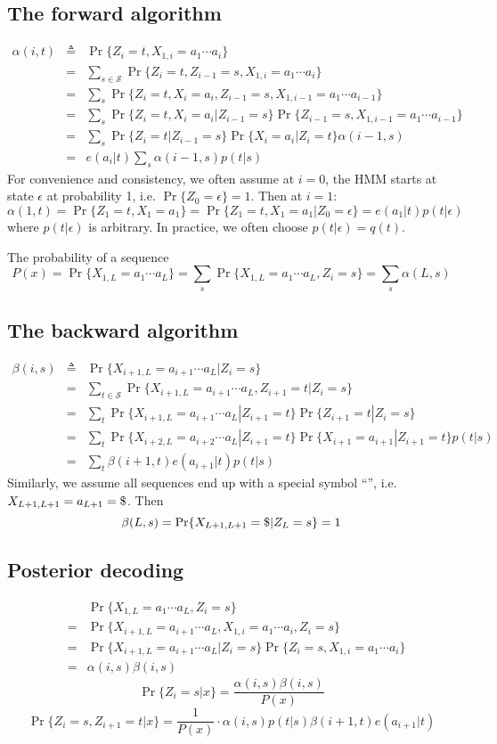 \documentclass[10pt]{article}
\begin{document}
\subsection{The forward algorithm}
\begin{eqnarray*}
\alpha(i,t)&\triangleq&\Pr\{Z_i=t,X_{1,i}=a_1\cdots a_i\}\\
&=&\sum_{s\in\mathcal{S}}\Pr\{Z_i=t,Z_{i-1}=s,X_{1,i}=a_1\cdots a_i\}\\
&=&\sum_s\Pr\{Z_i=t,X_i=a_i,Z_{i-1}=s,X_{1,{i-1}}=a_1\cdots a_{i-1}\}\\
&=&\sum_s\Pr\{Z_i=t,X_i=a_i|Z_{i-1}=s\}\Pr\{Z_{i-1}=s,X_{1,{i-1}}=a_1\cdots a_{i-1}\}\\
&=&\sum_s\Pr\{Z_i=t|Z_{i-1}=s\}\Pr\{X_i=a_i|Z_i=t\}\alpha(i-1,s)\\
&=&e(a_i|t)\sum_s\alpha(i-1,s)p(t|s)
\end{eqnarray*}
For convenience and consistency, we often assume at $i=0$, the HMM starts at
state $\epsilon$ at probability 1, i.e. $\Pr\{Z_0=\epsilon\}=1$. Then at $i=1$:
$$
\alpha(1,t)=\Pr\{Z_1=t,X_1=a_1\}=\Pr\{Z_1=t,X_1=a_1|Z_0=\epsilon\}=e(a_1|t)p(t|\epsilon)
$$
where $p(t|\epsilon)$ is arbitrary. In practice, we often choose
$p(t|\epsilon)=q(t)$.

The probability of a sequence
$$
P(x)=\Pr\{X_{1,L}=a_1\cdots a_L\}=\sum_s\Pr\{X_{1,L}=a_1\cdots a_L,Z_i=s\}=\sum_s\alpha(L,s)
$$

\subsection{The backward algorithm}
\begin{eqnarray*}
\beta(i,s)&\triangleq&\Pr\{X_{i+1,L}=a_{i+1}\cdots a_L|Z_i=s\}\\
&=&\sum_{t\in\mathcal{S}}\Pr\{X_{i+1,L}=a_{i+1}\cdots a_L,Z_{i+1}=t|Z_i=s\}\\
&=&\sum_t\Pr\{X_{i+1,L}=a_{i+1}\cdots a_L|Z_{i+1}=t\}\Pr\{Z_{i+1}=t|Z_i=s\}\\
&=&\sum_t\Pr\{X_{i+2,L}=a_{i+2}\cdots a_L|Z_{i+1}=t\}\Pr\{X_{i+1}=a_{i+1}|Z_{i+1}=t\}p(t|s)\\
&=&\sum_t\beta(i+1,t)e(a_{i+1}|t)p(t|s)
\end{eqnarray*}
Similarly, we assume all sequences end up with a special symbol
``{\tt{}}'', i.e. $X_{L+1,L+1}=a_{L+1}={\tt\char36}$. Then
$$
\beta(L,s)=\Pr\{X_{L+1,L+1}={\tt\char36}|Z_L=s\}=1
$$

\subsection{Posterior decoding}
\begin{eqnarray*}
&& \Pr\{X_{1,L}=a_1\cdots a_L,Z_i=s\}\\
&=&\Pr\{X_{i+1,L}=a_{i+1}\cdots a_L,X_{1,i}=a_1\cdots a_i,Z_i=s\}\\
&=&\Pr\{X_{i+1,L}=a_{i+1}\cdots a_L|Z_i=s\}\Pr\{Z_i=s,X_{1,i}=a_1\cdots a_i\}\\
&=&\alpha(i,s)\beta(i,s)
\end{eqnarray*}
$$
\Pr\{Z_i=s|x\}=\frac{\alpha(i,s)\beta(i,s)}{P(x)}
$$
$$
\Pr\{Z_i=s,Z_{i+1}=t|x\}=\frac{1}{P(x)}\cdot\alpha(i,s)p(t|s)\beta(i+1,t)e(a_{i+1}|t)
$$
\end{document}
